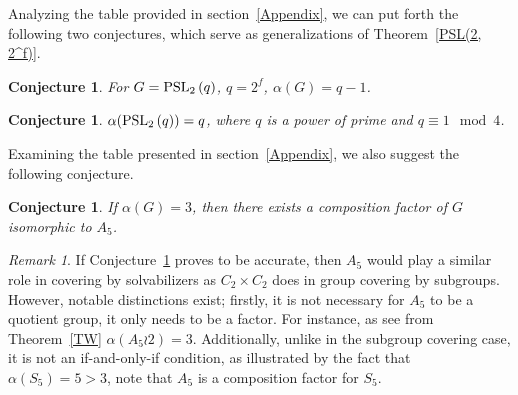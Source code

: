\documentclass{amsart}
\newtheorem{conjecture}[theorem]{Conjecture}
\theoremstyle{definition}
\theoremstyle{remark}
\newtheorem{remark}[theorem]{Remark}
\begin{document}
Analyzing the table provided in section~\ref{Appendix}, we can put forth the following two conjectures, which serve as generalizations of Theorem~\ref{PSL(2, 2^f)}.

\begin{conjecture}
For $G=\operatorname{PSL}_{2}\left(q\right)$, $q=2^f$, $\alpha(G)=q-1$.
\end{conjecture}
\begin{conjecture} $\alpha(\operatorname{PSL}_{2}\left(q\right))=q$, where $q$ is a power of prime and  $q \equiv 1 \mod 4$. \end{conjecture}

Examining the table presented in section~\ref{Appendix}, we also suggest the following conjecture.

\begin{conjecture}\label{A5} If $\alpha(G)=3$, then there exists a composition factor of $G$ isomorphic to $A_5$. \end{conjecture}

\begin{remark}
    If Conjecture~\ref{A5} proves to be accurate, then $A_5$ would play a similar role in covering by solvabilizers as $C_2 \times C_2$ does in group covering by subgroups. However, notable distinctions exist; firstly, it is not necessary for $A_5$ to be a quotient group, it only needs to be a factor. For instance, as see from Theorem~\ref{TW} $\alpha(A_5\wr 2)=3$. Additionally, unlike in the subgroup covering case, it is not an if-and-only-if condition, as illustrated by the fact \cite{GAP4} that $\alpha(S_5)=5>3$, note that  $A_5$ is a composition factor for $S_5$.
\end{remark}


\end{document}
